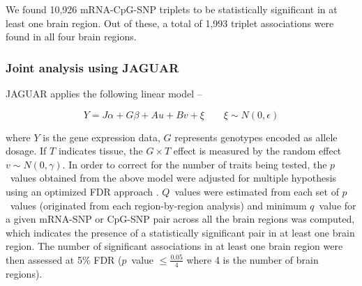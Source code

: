 \documentclass[hidelinks]{article}
\begin{document}
We found 10,926 mRNA-CpG-SNP triplets to be statistically significant in at least one brain region. Out of these, a total of 1,993 triplet associations were found in all four brain regions.



\subsubsection{Joint analysis using JAGUAR}

JAGUAR \cite{jaguar,jaguar_cran} applies the following linear model --

\begin{equation*}
Y = J\alpha + G\beta + Au + Bv  + \xi \qquad \xi \sim N\left(0, \epsilon \right)
\end{equation*}

where $Y$ is the gene expression data, $G$ represents genotypes encoded as allele dosage. If $T$ indicates tissue, the $G \times T$ effect is measured by the random effect $v \sim N\left(0,\gamma \right)$. In order to correct for the number of traits being tested, the $p$~values obtained from the above model were adjusted for multiple hypothesis using an optimized FDR approach \cite{qvalue}.  $Q$~values were estimated from each set of $p$~values (originated from each region-by-region analysis) and minimum $q$~value for a given mRNA-SNP or CpG-SNP pair across all the brain regions was computed, which indicates the presence of a statistically significant pair in at least one brain region. The number of significant associations in at least one brain region were then assessed at 5\% FDR ($p$~value $\leq \frac{0.05}{4}$ where 4 is the number of brain regions). 
\end{document}

